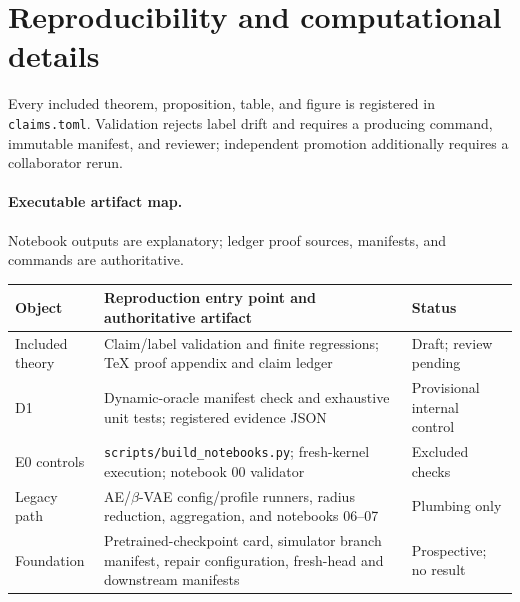 \section{Reproducibility and computational details}

\begingroup
\footnotesize
Every included theorem, proposition, table, and figure is registered in \texttt{claims.toml}.
Validation rejects label drift and requires a producing command, immutable manifest, and reviewer;
independent promotion additionally requires a collaborator rerun.

\paragraph{Executable artifact map.}
Notebook outputs are explanatory; ledger proof sources, manifests, and commands are authoritative.
\begingroup
\setlength{\tabcolsep}{2.5pt}
\renewcommand{\arraystretch}{1.06}
\begin{center}
\begin{tabular}{@{}p{.14\linewidth}p{.59\linewidth}p{.19\linewidth}@{}}
\toprule
Object & Reproduction entry point and authoritative artifact & Status \strut \\
\midrule
Included theory & Claim/label validation and finite regressions; TeX proof appendix and claim ledger & Draft; review pending \\
D1 & Dynamic-oracle manifest check and exhaustive unit tests; registered evidence JSON & Provisional internal control \\
E0 controls & \nolinkurl{scripts/build_notebooks.py}; fresh-kernel execution; notebook 00 validator & Excluded checks \\
Legacy path & AE/$\beta$-VAE config/profile runners, radius reduction, aggregation, and notebooks 06--07 & Plumbing only \\
Foundation & Pretrained-checkpoint card, simulator branch manifest, repair configuration, fresh-head and downstream manifests & Prospective; no result \\
\bottomrule
\end{tabular}
\end{center}
\endgroup

